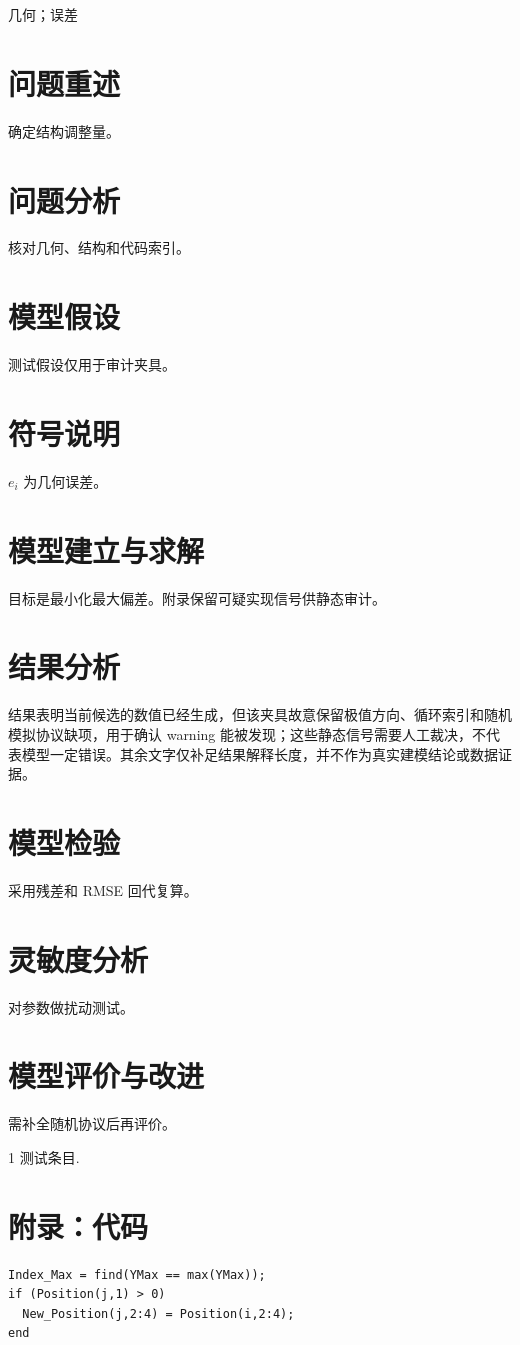 \documentclass{ctexart}
\newcommand{\keywords}[1]{#1}
\begin{document}
\begin{abstract}几何结构调整与随机模拟审计夹具。\end{abstract}
\keywords{几何；误差}
\section{问题重述}确定结构调整量。
\section{问题分析}核对几何、结构和代码索引。
\section{模型假设}测试假设仅用于审计夹具。
\section{符号说明}$e_i$ 为几何误差。
\section{模型建立与求解}
目标是最小化最大偏差。附录保留可疑实现信号供静态审计。
\section{结果分析}
结果表明当前候选的数值已经生成，但该夹具故意保留极值方向、循环索引和随机模拟协议缺项，用于确认 warning 能被发现；这些静态信号需要人工裁决，不代表模型一定错误。其余文字仅补足结果解释长度，并不作为真实建模结论或数据证据。
\section{模型检验}采用残差和 RMSE 回代复算。
\section{灵敏度分析}对参数做扰动测试。
\section{模型评价与改进}需补全随机协议后再评价。
\begin{thebibliography}{1} 测试条目.\end{thebibliography}
\appendix
\section{附录：代码}
\begin{verbatim}
Index_Max = find(YMax == max(YMax));
if (Position(j,1) > 0)
  New_Position(j,2:4) = Position(i,2:4);
end
\end{verbatim}
\end{document}
